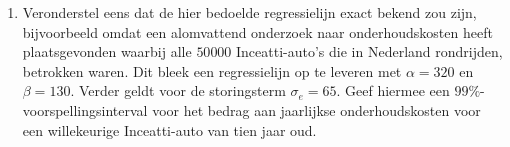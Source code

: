 \begin{enumerate}[label=(\alph*)]
{        Met $95\%$ betrouwbaarheid liggen de onderhoudskosten in de laatste $12$ maanden van een willekeurige Inceatti auto van $10$ jaar oud tussen ongeveer $1104$ en $1667$ euro.
    }

    \item Veronderstel eens dat de hier bedoelde regressielijn exact bekend zou zijn, bijvoorbeeld omdat een alomvattend onderzoek naar onderhoudskosten heeft plaatsgevonden waarbij alle $50 000$ Inceatti-auto's die in Nederland rondrijden, betrokken waren.
    Dit bleek een regressielijn op te leveren met $\alpha=320$ en $\beta=130$.
    Verder geldt voor de storingsterm $\sigma_e = 65$.
    Geef hiermee een $99\%$-voorspellingsinterval voor het bedrag aan jaarlijkse onderhoudskosten voor een willekeurige Inceatti-auto van tien jaar oud.
    \answer{
    
    }
\end{enumerate}